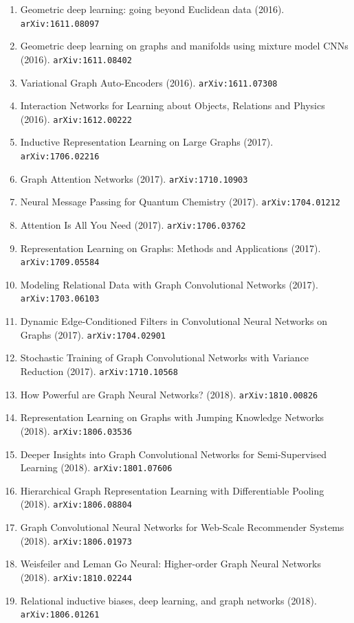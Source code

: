 \documentclass[11pt]{article}
\begin{document}
\begin{enumerate}
  \item Geometric deep learning: going beyond Euclidean data (2016). \texttt{arXiv:1611.08097}
  \item Geometric deep learning on graphs and manifolds using mixture model CNNs (2016). \texttt{arXiv:1611.08402}
  \item Variational Graph Auto-Encoders (2016). \texttt{arXiv:1611.07308}
  \item Interaction Networks for Learning about Objects, Relations and Physics (2016). \texttt{arXiv:1612.00222}
  \item Inductive Representation Learning on Large Graphs (2017). \texttt{arXiv:1706.02216}
  \item Graph Attention Networks (2017). \texttt{arXiv:1710.10903}
  \item Neural Message Passing for Quantum Chemistry (2017). \texttt{arXiv:1704.01212}
  \item Attention Is All You Need (2017). \texttt{arXiv:1706.03762}
  \item Representation Learning on Graphs: Methods and Applications (2017). \texttt{arXiv:1709.05584}
  \item Modeling Relational Data with Graph Convolutional Networks (2017). \texttt{arXiv:1703.06103}
  \item Dynamic Edge-Conditioned Filters in Convolutional Neural Networks on
  Graphs (2017). \texttt{arXiv:1704.02901}
  \item Stochastic Training of Graph Convolutional Networks with Variance
  Reduction (2017). \texttt{arXiv:1710.10568}
  \item How Powerful are Graph Neural Networks? (2018). \texttt{arXiv:1810.00826}
  \item Representation Learning on Graphs with Jumping Knowledge Networks (2018). \texttt{arXiv:1806.03536}
  \item Deeper Insights into Graph Convolutional Networks for Semi-Supervised
  Learning (2018). \texttt{arXiv:1801.07606}
  \item Hierarchical Graph Representation Learning with Differentiable Pooling (2018). \texttt{arXiv:1806.08804}
  \item Graph Convolutional Neural Networks for Web-Scale Recommender Systems (2018). \texttt{arXiv:1806.01973}
  \item Weisfeiler and Leman Go Neural: Higher-order Graph Neural Networks (2018). \texttt{arXiv:1810.02244}
  \item Relational inductive biases, deep learning, and graph networks (2018). \texttt{arXiv:1806.01261}

\end{enumerate}
\end{document}
